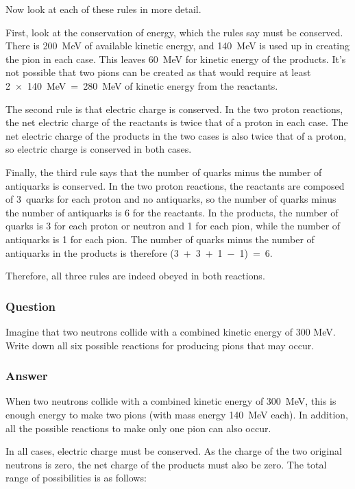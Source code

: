 \documentclass[letterpaper,10pt,english]{sphinxmanual}
\begin{document}
Now look at each of these rules in more detail.

First, look at the conservation of energy, which the rules say must be conserved. There is 200 MeV of available kinetic energy, and 140 MeV is used up in creating the pion in each case. This leaves 60 MeV for kinetic energy of the products. It’s not possible that two pions can be created as that would require at least 2 × 140 MeV = 280 MeV of kinetic energy from the reactants.

The second rule is that electric charge is conserved. In the two proton reactions, the net electric charge of the reactants is twice that of a proton in each case. The net electric charge of the products in the two cases is also twice that of a proton, so electric charge is conserved in both cases.

Finally, the third rule says that the number of quarks minus the number of antiquarks is conserved. In the two proton reactions, the reactants are composed of 3 quarks for each proton and no antiquarks, so the number of quarks minus the number of antiquarks is 6 for the reactants. In the products, the number of quarks is 3 for each proton or neutron and 1 for each pion, while the number of antiquarks is 1 for each pion. The number of quarks minus the number of antiquarks in the products is
therefore (3 + 3 + 1 − 1) = 6.

Therefore, all three rules are indeed obeyed in both reactions.


\subsubsection{Question}
\label{\detokenize{content/session_00/Part_00_05:id1}}
Imagine that two neutrons collide with a combined kinetic energy of 300 MeV. Write down all six possible reactions for producing pions that may occur.


\subsubsection{Answer}
\label{\detokenize{content/session_00/Part_00_05:id2}}
When two neutrons collide with a combined kinetic energy of 300 MeV, this is enough energy to make two pions (with mass energy 140 MeV each). In addition, all the possible reactions to make only one pion can also occur.

In all cases, electric charge must be conserved. As the charge of the two original neutrons is zero, the net charge of the products must also be zero. The total range of possibilities is as follows:
\end{document}

